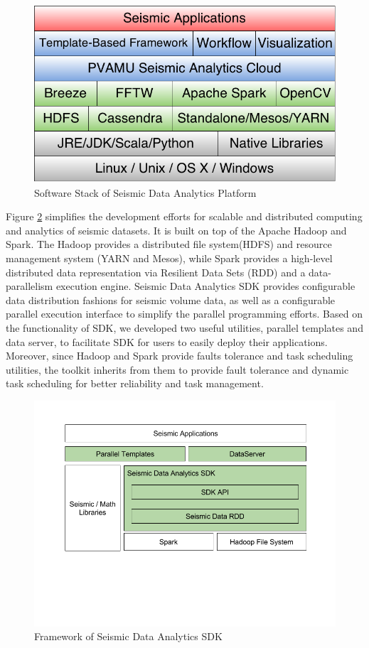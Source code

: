 \begin{figure}[h]
\centering
\includegraphics[scale=0.4]{figures/sdk_swstack.png}
\caption{Software Stack of Seismic Data Analytics Platform}
\label{sdk_swstack}
\end{figure}

Figure \ref{sdk_framework} simplifies the development efforts for scalable and distributed computing and analytics of seismic datasets. It is built on top of the Apache Hadoop and Spark. The Hadoop provides a distributed file system(HDFS) and resource management system (YARN and Mesos), while Spark provides a high-level distributed data representation via Resilient Data Sets (RDD) and a data-parallelism execution engine. Seismic Data Analytics SDK provides configurable data distribution fashions for seismic volume data, as well as a configurable parallel execution interface to simplify the parallel programming efforts. Based on the functionality of SDK, we developed two useful utilities, parallel templates and data server, to facilitate SDK for users to easily deploy their applications. Moreover, since Hadoop and Spark provide faults tolerance and task scheduling utilities, the toolkit inherits from them to provide fault tolerance and dynamic task scheduling for better reliability and task management.

\begin{figure}[h]
\centering
\includegraphics[scale=0.4]{figures/sdk_framework.png}
\caption{Framework of Seismic Data Analytics SDK}
\label{sdk_framework}
\end{figure}


